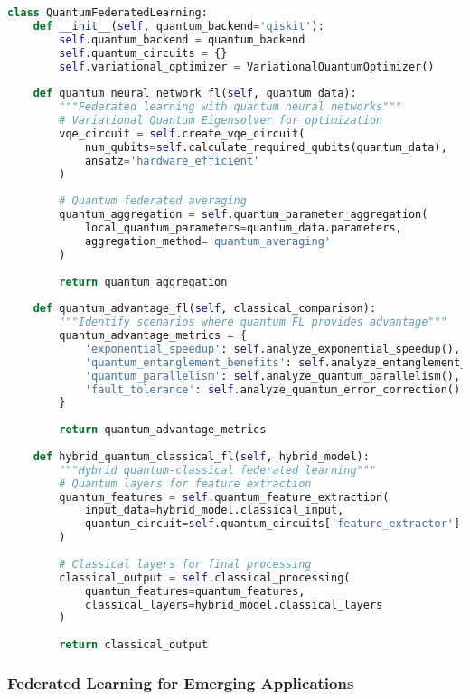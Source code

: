\begin{lstlisting}[language=python, caption=Quantum Federated Learning]
class QuantumFederatedLearning:
    def __init__(self, quantum_backend='qiskit'):
        self.quantum_backend = quantum_backend
        self.quantum_circuits = {}
        self.variational_optimizer = VariationalQuantumOptimizer()
        
    def quantum_neural_network_fl(self, quantum_data):
        """Federated learning with quantum neural networks"""
        # Variational Quantum Eigensolver for optimization
        vqe_circuit = self.create_vqe_circuit(
            num_qubits=self.calculate_required_qubits(quantum_data),
            ansatz='hardware_efficient'
        )
        
        # Quantum federated averaging
        quantum_aggregation = self.quantum_parameter_aggregation(
            local_quantum_parameters=quantum_data.parameters,
            aggregation_method='quantum_averaging'
        )
        
        return quantum_aggregation
        
    def quantum_advantage_fl(self, classical_comparison):
        """Identify scenarios where quantum FL provides advantage"""
        quantum_advantage_metrics = {
            'exponential_speedup': self.analyze_exponential_speedup(),
            'quantum_entanglement_benefits': self.analyze_entanglement_advantages(),
            'quantum_parallelism': self.analyze_quantum_parallelism(),
            'fault_tolerance': self.analyze_quantum_error_correction()
        }
        
        return quantum_advantage_metrics
        
    def hybrid_quantum_classical_fl(self, hybrid_model):
        """Hybrid quantum-classical federated learning"""
        # Quantum layers for feature extraction
        quantum_features = self.quantum_feature_extraction(
            input_data=hybrid_model.classical_input,
            quantum_circuit=self.quantum_circuits['feature_extractor']
        )
        
        # Classical layers for final processing
        classical_output = self.classical_processing(
            quantum_features=quantum_features,
            classical_layers=hybrid_model.classical_layers
        )
        
        return classical_output
\end{lstlisting}

\subsubsection{Federated Learning for Emerging Applications}

